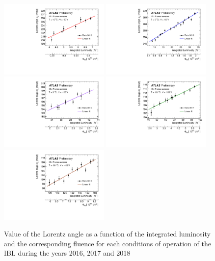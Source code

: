\begin{figure}[H]
\centering
\includegraphics[width=0.48\textwidth]{figures/SensorSimulation/pix-2019/fig_02.pdf}
\includegraphics[width=0.48\textwidth]{figures/SensorSimulation/pix-2019/fig_03.pdf}\\
\includegraphics[width=0.48\textwidth]{figures/SensorSimulation/pix-2019/fig_04.pdf}
\includegraphics[width=0.48\textwidth]{figures/SensorSimulation/pix-2019/fig_05.pdf}\\
\includegraphics[width=0.48\textwidth]{figures/SensorSimulation/pix-2019/fig_06.pdf}
\caption{Value of the Lorentz angle as a function of the integrated luminosity and the corresponding fluence for each conditions of operation of the IBL during the years 2016, 2017 and 2018}
\label{fig:lorentzPeriods}
\end{figure}
